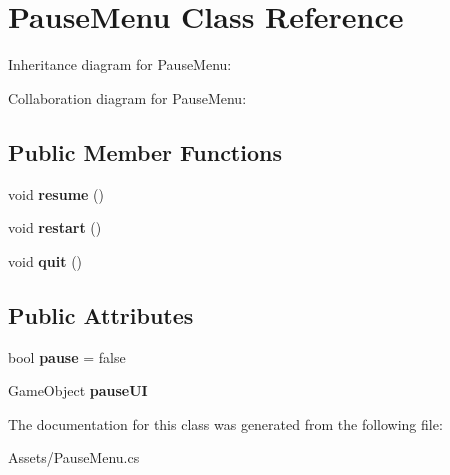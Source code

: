 \hypertarget{classPauseMenu}{}\section{Pause\+Menu Class Reference}
\label{classPauseMenu}


Inheritance diagram for Pause\+Menu\+:


Collaboration diagram for Pause\+Menu\+:
\subsection*{Public Member Functions}
\begin{DoxyCompactItemize}
\item 
void {\bfseries resume} ()\hypertarget{classPauseMenu_a5154b38962574431f4ccdc84df719752}{}\label{classPauseMenu_a5154b38962574431f4ccdc84df719752}

\item 
void {\bfseries restart} ()\hypertarget{classPauseMenu_a0db0c6ef18d00d7a183933646d1f0425}{}\label{classPauseMenu_a0db0c6ef18d00d7a183933646d1f0425}

\item 
void {\bfseries quit} ()\hypertarget{classPauseMenu_a964994e216b7a968f48c32a7ab00349a}{}\label{classPauseMenu_a964994e216b7a968f48c32a7ab00349a}

\end{DoxyCompactItemize}
\subsection*{Public Attributes}
\begin{DoxyCompactItemize}
\item 
bool {\bfseries pause} = false\hypertarget{classPauseMenu_a860f0e517c0c843c9ceecf0f3675dee7}{}\label{classPauseMenu_a860f0e517c0c843c9ceecf0f3675dee7}

\item 
Game\+Object {\bfseries pause\+UI}\hypertarget{classPauseMenu_ad0b4949972980e072b718447d51c28a3}{}\label{classPauseMenu_ad0b4949972980e072b718447d51c28a3}

\end{DoxyCompactItemize}


The documentation for this class was generated from the following file\+:\begin{DoxyCompactItemize}
\item 
Assets/Pause\+Menu.\+cs\end{DoxyCompactItemize}
